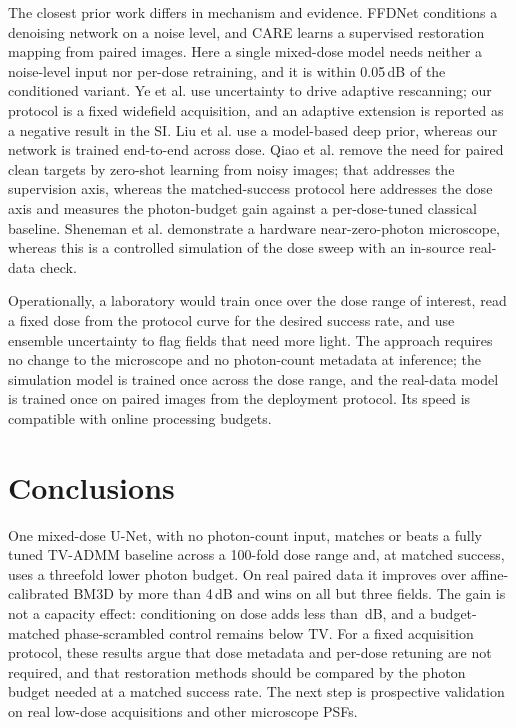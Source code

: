 \documentclass[10pt]{article}
\begin{document}
The closest prior work differs in mechanism and evidence. FFDNet conditions a
denoising network on a noise level, and CARE learns a supervised restoration
mapping from paired images. Here a single mixed-dose model needs neither a
noise-level input nor per-dose retraining, and it is within 0.05\,dB of the
conditioned variant. Ye et al. \cite{ye2025uncertainty} use uncertainty to
drive adaptive rescanning; our protocol is a fixed widefield acquisition, and
an adaptive extension is reported as a negative result in the SI. Liu et al.
\cite{liu2020degeneration} use a model-based deep prior, whereas our network is
trained end-to-end across dose. Qiao et al. \cite{qiao2024zsdeconvnet} remove
the need for paired clean targets by zero-shot learning from noisy images; that
addresses the supervision axis, whereas the matched-success protocol here
addresses the dose axis and measures the photon-budget gain against a
per-dose-tuned classical baseline. Sheneman et al. \cite{sheneman2025nearzero}
demonstrate a hardware near-zero-photon microscope, whereas this is a
controlled simulation
of the dose sweep with an in-source real-data check.

Operationally, a laboratory would train once over the dose range of interest,
read a fixed dose from the protocol curve for the desired success rate, and use
ensemble uncertainty to flag fields that need more light. The approach requires no change to the
microscope and no photon-count metadata at inference; the simulation model is
trained once across the dose range, and the real-data model is trained once on
paired images from the deployment protocol. Its speed is compatible with online
processing budgets.

\section*{Conclusions}
One mixed-dose U-Net, with no photon-count input, matches or beats a fully
tuned TV-ADMM baseline across a 100-fold dose range and, at matched success,
uses a threefold lower photon budget. On real paired data it improves over
affine-calibrated BM3D by more than 4\,dB and wins on all but three fields. The
gain is not a capacity effect: conditioning on dose adds less than
\CondStrongDelta\,dB, and a budget-matched phase-scrambled control remains below
TV. For a fixed acquisition protocol, these results argue that dose metadata
and per-dose retuning are not required, and that restoration methods should be
compared by the photon budget needed at a matched success rate. The next step
is prospective validation on real low-dose acquisitions and other microscope
PSFs.
\end{document}
